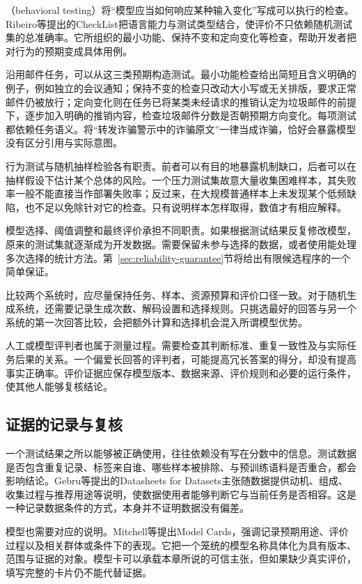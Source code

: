 （behavioral testing）将“模型应当如何响应某种输入变化”写成可以执行的检查。Ribeiro等提出的CheckList把语言能力与测试类型结合，使评价不只依赖随机测试集的总准确率。它所组织的最小功能、保持不变和定向变化等检查，帮助开发者把对行为的预期变成具体用例。

沿用邮件任务，可以从这三类预期构造测试。最小功能检查给出简短且含义明确的例子，例如独立的会议通知；保持不变的检查只改动大小写或无关排版，要求正常邮件仍被放行；定向变化则在任务已将某类未经请求的推销认定为垃圾邮件的前提下，逐步加入明确的推销内容，检查垃圾邮件分数是否朝预期方向变化。每项测试都依赖任务语义。将“转发诈骗警示中的诈骗原文”一律当成诈骗，恰好会暴露模型没有区分引用与实际意图。

行为测试与随机抽样检验各有职责。前者可以有目的地暴露机制缺口，后者可以在抽样假设下估计某个总体的风险。一个压力测试集故意大量收集困难样本，其失败率一般不能直接当作部署失败率；反过来，在大规模普通样本上未发现某个低频缺陷，也不足以免除针对它的检查。只有说明样本怎样取得，数值才有相应解释。

模型选择、阈值调整和最终评价承担不同职责。如果根据测试结果反复修改模型，原来的测试集就逐渐成为开发数据。需要保留未参与选择的数据，或者使用能处理多次选择的统计方法。第~\ref{sec:reliability-guarantee}节将给出有限候选程序的一个简单保证。

比较两个系统时，应尽量保持任务、样本、资源预算和评价口径一致。对于随机生成系统，还需要记录生成次数、解码设置和选择规则。只挑选最好的回答与另一个系统的第一次回答比较，会把额外计算和选择机会混入所谓模型优势。

人工或模型评判者也属于测量过程。需要检查其判断标准、重复一致性及与实际任务后果的关系。一个偏爱长回答的评判者，可能提高冗长答案的得分，却没有提高事实正确率。评价证据应保存模型版本、数据来源、评价规则和必要的运行条件，使其他人能够复核结论。

\subsection{证据的记录与复核}

一个测试结果之所以能够被正确使用，往往依赖没有写在分数中的信息。测试数据是否包含重复记录、标签来自谁、哪些样本被排除、与预训练语料是否重合，都会影响结论。Gebru等提出的Datasheets for Datasets主张随数据提供动机、组成、收集过程与推荐用途等说明，使数据使用者能够判断它与当前任务是否相容。这是一种记录数据条件的方式，本身并不证明数据没有偏差。

模型也需要对应的说明。Mitchell等提出Model Cards，强调记录预期用途、评价过程以及相关群体或条件下的表现。它把一个笼统的模型名称具体化为具有版本、范围与证据的对象。模型卡可以承载本章所说的可信主张，但如果缺少真实评价，填写完整的卡片仍不能代替证据。

